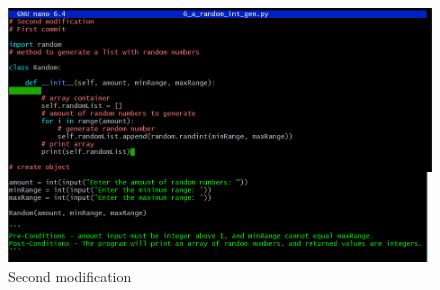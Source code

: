 \documentclass{article}
\begin{document}
\begin{figure}[ht]
	\centering
	\includegraphics[width=\textwidth]{git_4.png}
	\caption{Second modification}
	\label{fig:git_4}
\end{figure}

\newpage


\end{document}
